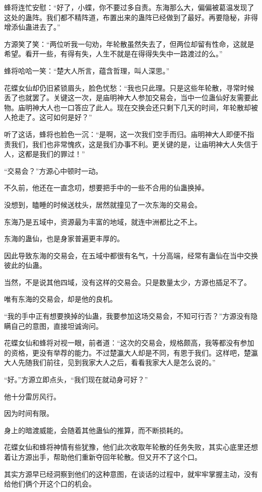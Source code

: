 \begin{this_body}
蜂将连忙安慰：“好了，小蝶，你不要过多自责。东海那么大，偏偏被葛温发现了这处的蛊阵。我们都不精阵道，布置出来的蛊阵已经做到了最好。再要隐秘，非得增添仙蛊进去了。”

方源笑了笑：“两位听我一句劝，年轮散虽然失去了，但两位却留有性命，这就是希望。看开一些，有得有失，人生不就是在得得失失中一路渡过的么。”

蜂将哈哈一笑：“楚大人所言，蕴含哲理，叫人深思。”

花蝶女仙却仍旧紧锁眉头，脸色忧愁：“我也只此理。只是这些年轮散，寻常时候丢了也就罢了。关键这一次，是庙明神大人参加交易会，当中一位蛊仙好友需要此物。庙明神大人也一口答应了此人。现在交换会还只剩下几天的时间，年轮散却被人抢走了。这可如何是好？”

听了这话，蜂将也脸色一沉：“是啊，这一次我们空手而归。庙明神大人即便不指责我们，我们也非常愧疚，这是我们办事不利。更关键的是，让庙明神大人失信于人，这都是我们的罪过！”

“交易会？”方源心中顿时一动。

不久前，他还在一直念叨，想要把手中的一些不合用的仙蛊换掉。

没想到，瞌睡的时候送枕头，居然就撞见了一次东海的交易会。

东海乃是五域中，资源最为丰富的地域，就连中洲都比之不上。

东海的蛊仙，也是身家普遍更丰厚的。

因此导致东海的交易会，在五域中都很有名气，十分高端，经常有蛊仙在当中交换彼此的仙蛊。

当然，不是说其他四域，没有这样的交易会。只是数量太少，方源也插足不了。

唯有东海的交易会，却是他的良机。

“我的手中正有想要换掉的仙蛊，我要参加这场交易会，不知可行否？”方源没有隐瞒自己的意图，直接坦诚询问。

花蝶女仙和蜂将对视一眼，前者道：“这次的交易会，规格颇高，我等都没有参加的资格，更没有举荐的能力。不过楚瀛大人却是不同，有恩于我们。这样吧，楚瀛大人先随我们前往，见到我家大人之后，看看我家大人是怎么说的。”

“好。”方源立即点头，“我们现在就动身可好？”

他十分雷厉风行。

因为时间有限。

身上的暗渡威能，会随着其他蛊仙的推算，而不断损耗的。

花蝶女仙和蜂将神情有些犹豫，他们此次收取年轮散的任务失败，其实心底里还想着让方源出手，帮助他们重新夺回年轮散。但又开不了这个口。

其实方源早已经洞察到他们的这种意图，在谈话的过程中，就牢牢掌握主动，没有给他们俩个开这个口的机会。


\end{this_body}
